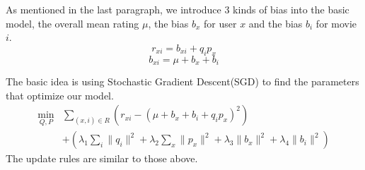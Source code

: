 \documentclass[sigconf]{acmart}
\begin{document}
As mentioned in the last paragraph, we introduce 3 kinds of bias into the basic model, the overall mean rating $\mu$, the bias $b_x$ for user $x$ and the bias $b_i$ for movie $i$.
\begin{equation}
	r_{xi} = b_{xi} + q_i p_x
\end{equation}
\begin{equation}
	b_{xi} = \mu + b_x + b_i
\end{equation}

The basic idea is using Stochastic Gradient Descent(SGD) to find the parameters that optimize our model.
\begin{equation}
	\begin{split}
	\min_{Q,P} & \sum_{(x,i) \in R} (r_{xi} - (\mu + b_x + b_i + q_i p_x)^2) \\
	& + (\lambda_1 \sum_i \| q_i \|^2 + \lambda_2 \sum_x \| p_x \|^2 + \lambda_3 \| b_x \|^2 + \lambda_4 \| b_i \|^2)
	\end{split}
\end{equation}
The update rules are similar to those above.
\end{document}
